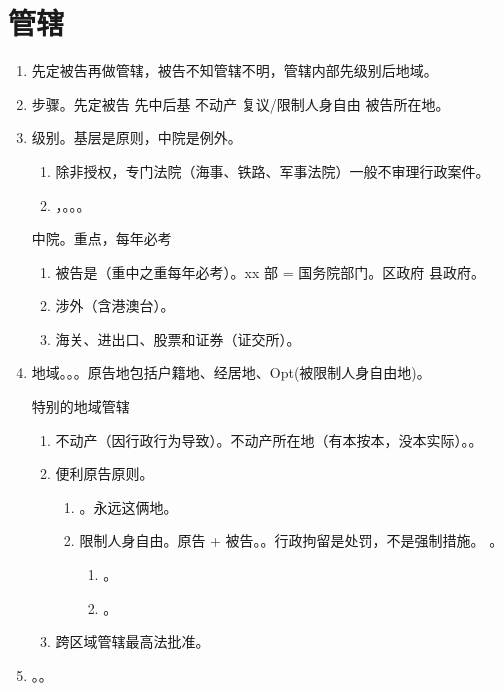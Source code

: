 \section{管辖}
\begin{enumerate}
	\item 先定被告再做管辖，被告不知管辖不明，管辖内部先级别后地域。
	\item 步骤。先定被告 \yjt 先中后基 \yjt 不动产 \yjt 复议/限制人身自由 \yjt 被告所在地。
	\item 级别。基层是原则，中院是例外。
	      \begin{enumerate}
		      \item 除非授权，专门法院（海事、铁路、军事法院）一般不审理行政案件。
		      \item {}，。。。
	      \end{enumerate}

	      \begin{kk}{中院。重点，每年必考}
		      \begin{enumerate}
			      \item 被告是（重中之重每年必考）。xx 部 = 国务院部门。区政府 \ydy 县政府。
			      \item 涉外（含港澳台）。
			      \item 海关、进出口、股票和证券（证交所）。
		      \end{enumerate}
	      \end{kk}
	\item 地域。。。原告地包括户籍地、经居地、Opt(被限制人身自由地)。
	      \begin{kk}{特别的地域管辖}
		      \begin{enumerate}
			      \item 不动产（因行政行为导致）。不动产所在地（有本按本，没本实际）。。
			      \item 便利原告原则。
			            \begin{enumerate}
				            \item {}。永远这俩地。
				            \item 限制人身自由。原告 + 被告。。行政拘留是处罚，不是强制措施。
				                  。
				                  \begin{enumerate}
					                  \item {}。
					                  \item {}。
				                  \end{enumerate}
			            \end{enumerate}
			      \item 跨区域管辖最高法批准。
		      \end{enumerate}
	      \end{kk}
	\item {}。。
\end{enumerate}
